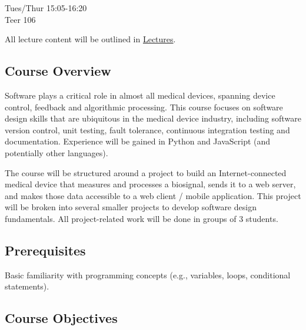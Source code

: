 Tues/Thur 15:05-16:20\\
Teer 106

All lecture content will be outlined in \href{Lectures/}{Lectures}.

\subsection*{Course Overview}
Software plays a critical role in almost all medical devices, spanning device
control, feedback and algorithmic processing. This course focuses on software
design skills that are ubiquitous in the medical device industry, including
software version control, unit testing, fault tolerance, continuous
integration testing and documentation. Experience will be gained in Python
and JavaScript (and potentially other languages).

The course will be structured around a project to build an Internet-connected
medical device that measures and processes a biosignal, sends it to a web
server, and makes those data accessible to a web client / mobile application.
This project will be broken into several smaller projects to develop software
design fundamentals. All project-related work will be done in groups of 3
students.

\subsection*{Prerequisites}

Basic familiarity with programming concepts (e.g., variables, loops,
conditional statements).

\subsection*{Course Objectives}

